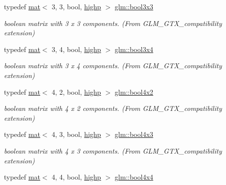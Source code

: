 \begin{DoxyCompactItemize}
typedef \mbox{\hyperlink{structglm_1_1mat}{mat}}$<$ 3, 3, bool, \mbox{\hyperlink{namespaceglm_a36ed105b07c7746804d7fdc7cc90ff25ac6f7eab42eacbb10d59a58e95e362074}{highp}} $>$ \mbox{\hyperlink{group__gtx__compatibility_gac56217a837f277fa163565d9858f66cf}{glm\+::bool3x3}}
\begin{DoxyCompactList}\small\item\em boolean matrix with 3 x 3 components. (From G\+L\+M\+\_\+\+G\+T\+X\+\_\+compatibility extension) \end{DoxyCompactList}\item 
typedef \mbox{\hyperlink{structglm_1_1mat}{mat}}$<$ 3, 4, bool, \mbox{\hyperlink{namespaceglm_a36ed105b07c7746804d7fdc7cc90ff25ac6f7eab42eacbb10d59a58e95e362074}{highp}} $>$ \mbox{\hyperlink{group__gtx__compatibility_ga3bec11b90dfdd4c6b37af3ae6e8f7c29}{glm\+::bool3x4}}
\begin{DoxyCompactList}\small\item\em boolean matrix with 3 x 4 components. (From G\+L\+M\+\_\+\+G\+T\+X\+\_\+compatibility extension) \end{DoxyCompactList}\item 
typedef \mbox{\hyperlink{structglm_1_1mat}{mat}}$<$ 4, 2, bool, \mbox{\hyperlink{namespaceglm_a36ed105b07c7746804d7fdc7cc90ff25ac6f7eab42eacbb10d59a58e95e362074}{highp}} $>$ \mbox{\hyperlink{group__gtx__compatibility_gaad9844846cb1d1f74c4b00ddb8e582ef}{glm\+::bool4x2}}
\begin{DoxyCompactList}\small\item\em boolean matrix with 4 x 2 components. (From G\+L\+M\+\_\+\+G\+T\+X\+\_\+compatibility extension) \end{DoxyCompactList}\item 
typedef \mbox{\hyperlink{structglm_1_1mat}{mat}}$<$ 4, 3, bool, \mbox{\hyperlink{namespaceglm_a36ed105b07c7746804d7fdc7cc90ff25ac6f7eab42eacbb10d59a58e95e362074}{highp}} $>$ \mbox{\hyperlink{group__gtx__compatibility_gab1a5519fb12e67d9940fa4d9b4590198}{glm\+::bool4x3}}
\begin{DoxyCompactList}\small\item\em boolean matrix with 4 x 3 components. (From G\+L\+M\+\_\+\+G\+T\+X\+\_\+compatibility extension) \end{DoxyCompactList}\item 
typedef \mbox{\hyperlink{structglm_1_1mat}{mat}}$<$ 4, 4, bool, \mbox{\hyperlink{namespaceglm_a36ed105b07c7746804d7fdc7cc90ff25ac6f7eab42eacbb10d59a58e95e362074}{highp}} $>$ \mbox{\hyperlink{group__gtx__compatibility_ga568a1c97a6c6f7253334ee5933a6cb77}{glm\+::bool4x4}}

\end{DoxyCompactItemize}

